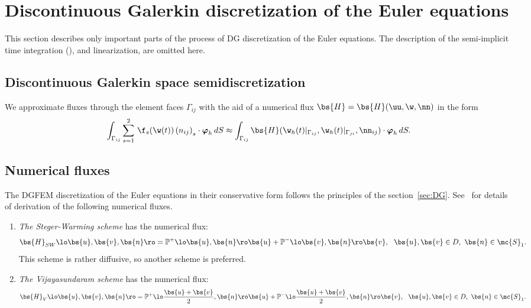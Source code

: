 \vspace{5mm}
\section{Discontinuous Galerkin discretization of the Euler equations}
\label{sec:DGEuler}
This section describes only important parts of the process of DG discretization of the Euler equations. The description of the semi-implicit time integration (\cite{DF04}), and linearization, are omitted here.
\subsection{Discontinuous Galerkin space semidiscretization}
We approximate fluxes through the element faces $\Gamma_{ij}$ with the aid of a numerical flux $\bs{H}=\bs{H}(\uu,\w,\nn)$ in the form
\begin{equation} \label{eq:5}
\int_{\Gamma_{ij}}  \sum_{s=1}^2\,\f_s(\w(t))\,{(n_{ij})}_s\cdot \boldsymbol{\varphi}_h \,d S
 \approx
\int_{\Gamma_{ij}} 
\bs{H}(\w_h(t)|_{\Gamma_{ij}}, \w_h(t)|_{\Gamma_{ji}},\nn_{ij})\cdot\boldsymbol{\varphi}_h\,d S.
\end{equation}

\subsection{Numerical fluxes}
  The DGFEM discretization of the Euler equations in their conservative form follows the principles of the section~\ref{sec:DG}. See~\cite{1993} for details of derivation of the following numerical fluxes.
\begin{enumerate}
\item \emph{The Steger-Warming scheme} has the numerical flux:
$$ \bs{H}_{SW}\lo\bs{u},\bs{v},\bs{n}\ro = \mathbb{P}^+\lo\bs{u},\bs{n}\ro\bs{u} + \mathbb{P}^-\lo\bs{v},\bs{n}\ro\bs{v},\ \ \bs{u},\bs{v}\in D,\ \bs{n}\in\mc{S}_1.$$
This scheme is rather diffusive, so another scheme is preferred.
\item  \emph{The Vijayasundaram scheme} has the numerical flux:
$$ \bs{H}_{V}\lo\bs{u},\bs{v},\bs{n}\ro = \mathbb{P}^+\lo\frac{\bs{u} + \bs{v}}{2},\bs{n}\ro\bs{u} + \mathbb{P}^-\lo\frac{\bs{u} + \bs{v}}{2},\bs{n}\ro\bs{v},\ \ \bs{u},\bs{v}\in D,\ \bs{n}\in\mc{S}_1.$$
\end{enumerate}

